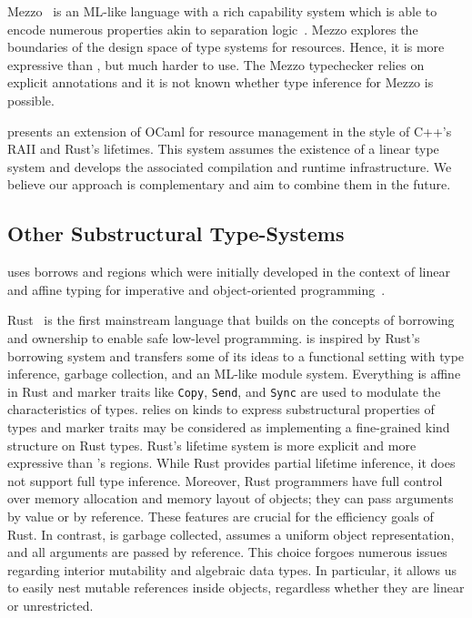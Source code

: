 Mezzo~\citep{DBLP:phd/hal/Protzenko14,DBLP:journals/toplas/BalabonskiPP16} is an ML-like language
with a rich capability system which is able to encode numerous
properties akin to separation logic~\citep{DBLP:conf/lics/Reynolds02}.
Mezzo explores the  boundaries of the design space of type systems for
resources. Hence, it is more expressive than \lang, but
much harder to use. The Mezzo typechecker relies on explicit
annotations and it is not known whether type inference for Mezzo is possible.

\citet{DBLP:journals/corr/abs-1803-02796} presents
an extension of OCaml for resource management in the style of C++'s RAII
and Rust's lifetimes. This system assumes
the existence of a linear type system and develops the associated compilation
and runtime infrastructure. We believe our approach is
complementary and aim to combine them in the future.

\subsection{Other Substructural Type-Systems}

\lang uses borrows and regions
which were initially developed in the context of linear and affine
typing for  imperative and
object-oriented
programming~\citep{DBLP:conf/popl/BoylandR05,DBLP:conf/pldi/GrossmanMJHWC02}.

Rust~\citep{rust} is the first
mainstream language that builds on the concepts of borrowing and ownership
to enable safe low-level programming.
\lang is inspired by Rust's borrowing system and transfers some of its
ideas  to a functional setting with type inference, garbage collection, and
an ML-like module system.
Everything is affine in Rust and marker traits like \lstinline/Copy/,
\lstinline/Send/, and \lstinline/Sync/ are used to modulate the characteristics 
of types. \lang relies on kinds to express substructural properties of
types and marker traits may be considered as implementing a
fine-grained kind structure on Rust types.
Rust's lifetime system is more explicit and more expressive than
\lang's regions.
While Rust provides partial lifetime inference, it
does not support full type inference.
Moreover, Rust programmers have full control over memory allocation
and memory layout of objects; they can pass arguments by value or by reference.
These features are crucial for the efficiency goals of Rust.
In contrast, \lang is garbage collected, assumes a uniform object
representation, and all arguments are passed by reference. This choice
forgoes numerous  
issues regarding interior mutability and algebraic data types.
In particular, it
allows us to easily nest mutable references inside objects, regardless
whether they are linear or unrestricted.

